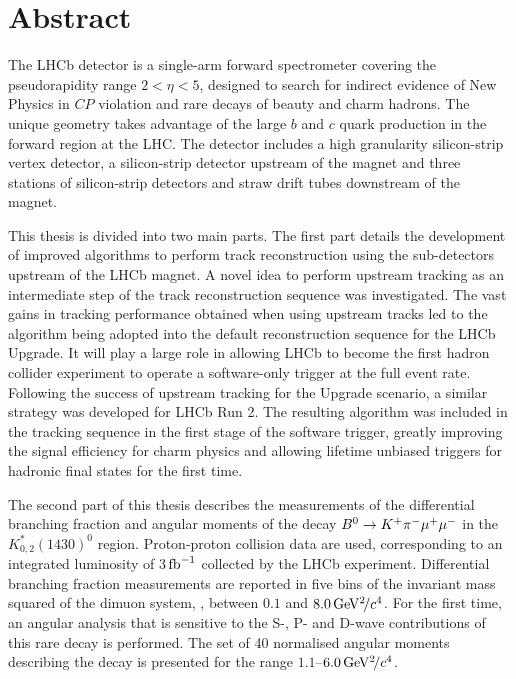 \section*{Abstract}

The LHCb detector is a single-arm forward spectrometer covering the pseudorapidity range $2 < \eta < 5$, designed to search for indirect evidence of New Physics in $C\!P$ violation and rare decays of beauty and charm hadrons. The unique geometry takes advantage of the large $b$ and $c$ quark production in the forward region at the LHC. The detector includes a high granularity silicon-strip vertex detector, a silicon-strip detector upstream of the magnet and three stations of silicon-strip detectors and straw drift tubes downstream of the magnet.

This thesis is divided into two main parts. The first part details the development of improved algorithms to perform track reconstruction using the sub-detectors upstream of the LHCb magnet. A novel idea to perform upstream tracking as an intermediate step of the track reconstruction sequence was investigated. The vast gains in tracking performance obtained when using upstream tracks led to the algorithm being adopted into the default reconstruction sequence for the LHCb Upgrade. It will play a large role in allowing LHCb to become the first hadron collider experiment to operate a software-only trigger at the full event rate. Following the success of upstream tracking for the Upgrade scenario, a similar strategy was developed for LHCb Run 2. The resulting algorithm was included in the tracking sequence in the first stage of the software trigger, greatly improving the signal efficiency for charm physics and allowing lifetime unbiased triggers for hadronic final states for the first time.

The second part of this thesis describes the measurements of the differential branching fraction and angular moments of the decay ${B}^{0} \rightarrow K^{+}\pi^{-}\mu^{+}\mu^{-}$ in the $K^{*}_{0,2}(1430)^{0}$ region. Proton-proton collision data are used, corresponding to an integrated luminosity of 3$\mbox{\,fb}^{-1}$ collected by the LHCb experiment. Differential branching fraction measurements are reported in five bins of the invariant mass squared of the dimuon system, \qsq, between $0.1$ and $8.0{\mathrm{\,Ge\kern -0.1em V^2\!/}c^4}$. For the first time, an angular analysis that is sensitive to the S-, P- and D-wave contributions of this rare decay is performed. The set of 40 normalised angular moments describing the decay is presented for the \qsq range $1.1$--$6.0{\mathrm{\,Ge\kern -0.1em V^2\!/}c^4}$. 